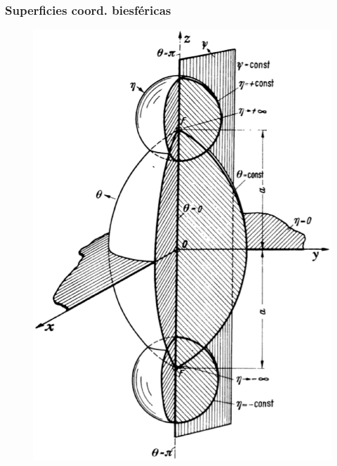 \documentclass[12pt]{beamer}
\begin{document}
\begin{frame}
\frametitle{Superficies coord. biesféricas}
\begin{figure}[H]
\centering
\includegraphics[scale=0.25]{Imagenes/Sistema_Biesferico.eps}
\end{figure}
\end{frame}
\end{document}
